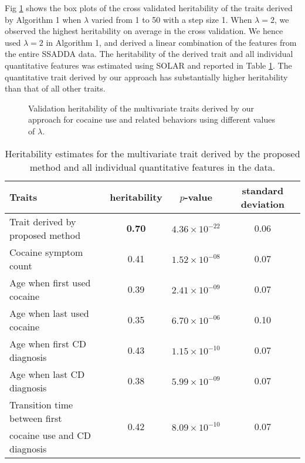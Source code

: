 \documentclass[10pt,letterpaper]{article}
\begin{document}
Fig \ref{fig:coc_cv} shows the box plots of the cross validated heritability of the traits derived by Algorithm 1 when $\lambda$ varied from 1 to 50 with a step size 1.  When $\lambda = 2$, we observed the highest heritability on average in the cross validation. We hence used $\lambda = 2$ in Algorithm 1, and derived a linear combination of the features from the entire SSADDA data. The heritability of the derived trait and all individual quantitative features was estimated using SOLAR and reported in Table \ref{tbl:coc_heritability}. The quantitative trait derived by our approach has substantially higher heritability than that of all other traits.  
\begin{figure}[ht]
	\vskip 0.2in
	\begin{center}
		\caption{Validation heritability of the multivariate traits derived by our approach for cocaine use and related behaviors using different values of $\lambda$.}
		\label{fig:coc_cv}
	\end{center}
	\vskip -0.2in
\end{figure}
\begin{table}[t]
	\caption{Heritability estimates for the multivariate trait derived by the proposed method and all individual quantitative features in the data.}
	\label{tbl:coc_heritability}
	\vskip 0.15in
	\begin{center}
		\begin{small}
			
			\begin{tabular}{lccc}
				\hline
				Traits	                                          &  heritability	      &$p$-value	      &standard deviation        \\
				\hline
				Trait derived by proposed method	                          & {\bf 0.70} & $4.36\times 10^{-22}$ & 0.06   \\
				Cocaine symptom count                                       &  0.41 &	$1.52\times 10^{-08}$	& 0.07   \\
				Age when first used cocaine                                   &  0.39 &	$2.41\times 10^{-09}$	& 0.07   \\
				Age when last used cocaine                                    &  0.35 &	$6.70\times 10^{-06}$	& 0.10   \\
				Age when first CD diagnosis                                   &  0.43 &	$1.15\times 10^{-10}$	& 0.07   \\
				Age when last CD diagnosis                                    &  0.38 &	$5.99\times 10^{-09}$	& 0.07   \\
				Transition time between first & \multirow{2}{*}{0.42} &	\multirow{2}{*}{$8.09\times 10^{-10}$}	& \multirow{2}{*}{0.07} \\
				cocaine use and CD diagnosis  &    & 	&     \\ 
				\hline
			\end{tabular}
			
		\end{small}
	\end{center}
	\vskip -0.1in
\end{table}
\end{document}

